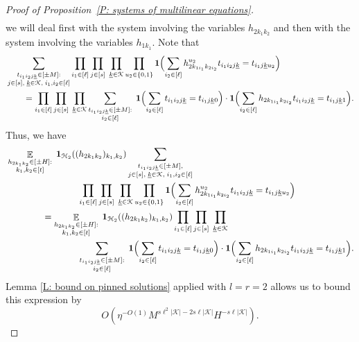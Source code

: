 \documentclass[11pt]{amsart}
\theoremstyle{definition}
\DeclareMathOperator*{\E}{\mathbb{E}}
\newcommand{\CH}{{\mathcal H}}
\newcommand{\CK}{{\mathcal K}}
\newcommand{\uk}{{\underline{k}}}
\newcommand{\Bigbrac}[1]{\Bigl( #1 \Bigr)}
\begin{document}
\begin{proof}[Proof of Proposition~\ref{P: systems of multilinear equations}]
\begin{align*}
    \end{align*}
    we will deal first with the system involving the variables $h_{2k_1k_2}$ and then with the system involving the variables $h_{1k_1}$. Note that
    \begin{align*}
        &\sum_{\substack{t_{i_1 i_2 j\uk}\in[\pm M]:\\ j\in[s],\; \uk\in\CK,\; i_1, i_2\in[\ell]}}\prod_{i_1\in[\ell]}\prod_{j\in[s]}\; \prod_{\substack{\uk\in\CK}}\prod_{\substack{u_2\in\{0,1\}}} \mathbf{1}\Bigbrac{\sum\limits_{i_2\in[\ell]} h_{2k_{1i_1}k_{2i_2}}^{u_2} t_{i_1 i_2 j\uk} = t_{i_1 j\uk u_2}}\\
        &\qquad=\prod_{i_1\in[\ell]}\prod_{j\in[s]}\; \prod_{\substack{\uk\in\CK}}\sum_{\substack{t_{i_1 i_2 j\uk}\in[\pm M]:\\ i_2\in[\ell]}}\; \mathbf{1}\Bigbrac{\sum\limits_{i_2\in[\ell]} t_{i_1 i_2 j\uk} = t_{i_1 j\uk 0}}\cdot \mathbf{1}\Bigbrac{\sum\limits_{i_2\in[\ell]} h_{2k_{1i_1}k_{2i_2}} t_{i_1 i_2 j\uk} = t_{i_1 j\uk 1}}.
    \end{align*}
    Thus, we have
    \begin{align*}
        &\E_{\substack{h_{2k_1k_2}\in[\pm H]:\\  k_1, k_2\in[t]}}\; \mathbf{1}_{\CH_2}((h_{2k_1k_2})_{k_1, k_2})
        \sum_{\substack{t_{i_1 i_2 j\uk}\in[\pm M],\\ j\in[s],\; \uk\in\CK,\; i_1, i_2\in[\ell]}}\\
        &\qquad\qquad\qquad\qquad\prod_{i_1\in[\ell]}\prod_{j\in[s]}\; \prod_{\substack{\uk\in\CK}}\prod_{\substack{u_2\in\{0,1\}}} \mathbf{1}\Bigbrac{\sum\limits_{i_2\in[\ell]} h_{2k_{1i_1}k_{2i_2}}^{u_2} t_{i_1 i_2 j\uk} = t_{i_1 j\uk u_2}}\\
        &\qquad\qquad= \E_{\substack{h_{2k_1k_2}\in[\pm H]:\\  k_1, k_2\in[t]}}\; \mathbf{1}_{\CH_2}((h_{2k_1k_2})_{k_1, k_2})\prod_{i_1\in[\ell]}\prod_{j\in[s]}\; \prod_{\substack{\uk\in\CK}}\\ 
        &\qquad\qquad\qquad\qquad\sum_{\substack{t_{i_1 i_2 j\uk}\in[\pm M]:\\ i_2\in[\ell]}}\; \mathbf{1}\Bigbrac{\sum\limits_{i_2\in[\ell]} t_{i_1 i_2 j\uk} = t_{i_1 j\uk 0}}\cdot \mathbf{1}\Bigbrac{\sum\limits_{i_2\in[\ell]} h_{2k_{1i_1}k_{2i_2}} t_{i_1 i_2 j\uk} = t_{i_1 j\uk 1}}.
    \end{align*}
    Lemma \ref{L: bound on pinned solutions} applied with $l=r=2$ allows us to bound this expression by 
    $$O(\eta^{-O(1)} M^{s\ell^2|\CK|-2s\ell|\CK|} H^{-s\ell|\CK|}).$$

\end{proof}
\end{document}
